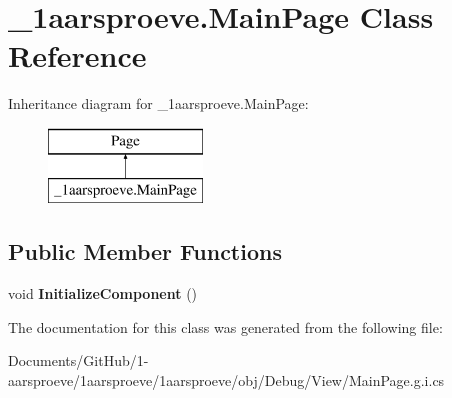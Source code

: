 \hypertarget{class__1aarsproeve_1_1_main_page}{}\section{\+\_\+1aarsproeve.\+Main\+Page Class Reference}
\label{class__1aarsproeve_1_1_main_page}
Inheritance diagram for \+\_\+1aarsproeve.\+Main\+Page\+:\begin{figure}[H]
\begin{center}
\leavevmode
\includegraphics[height=2.000000cm]{class__1aarsproeve_1_1_main_page}
\end{center}
\end{figure}
\subsection*{Public Member Functions}
\begin{DoxyCompactItemize}
\item 
\hypertarget{class__1aarsproeve_1_1_main_page_a894e5b8cbf318b168cecd11961976ccf}{}void {\bfseries Initialize\+Component} ()\label{class__1aarsproeve_1_1_main_page_a894e5b8cbf318b168cecd11961976ccf}

\end{DoxyCompactItemize}


The documentation for this class was generated from the following file\+:\begin{DoxyCompactItemize}
\item 
Documents/\+Git\+Hub/1-\/aarsproeve/1aarsproeve/1aarsproeve/obj/\+Debug/\+View/Main\+Page.\+g.\+i.\+cs\end{DoxyCompactItemize}
